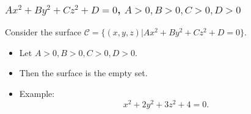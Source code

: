 
\begin{frame}
\frametitle{$Ax^2+By^2+Cz^2+D=0$, $A>0, B>0, C>0, D>0$}
Consider the surface 
$\mathcal C =\{(x,y,z) |Ax^2+By^2+Cz^2+D=0 \}$.

\begin{itemize}
\item Let $A>0, B>0, C>0, D>0$.
\item<2-> Then the surface is the empty set.
\item<3-> Example: 
\[
x^2+2y^2+3z^2+4=0.
\]
\end{itemize}
\vskip 10cm

\end{frame}